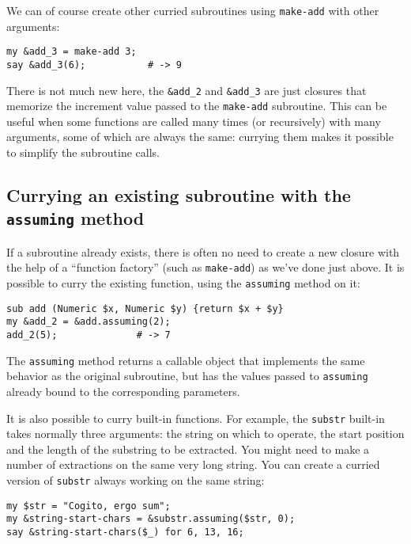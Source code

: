 We can of course create other curried subroutines using 
{\tt make-add} with other arguments:

\begin{verbatim}
my &add_3 = make-add 3;
say &add_3(6);           # -> 9
\end{verbatim}

There is not much new here, the \verb'&add_2' and 
\verb'&add_3' are just closures that memorize the 
increment value passed to the {\tt make-add} 
subroutine. This can be useful when some functions 
are called many times (or recursively) with many  
arguments, some of which are always the same: 
currying them makes it possible to simplify the 
subroutine calls.

\subsection{Currying an existing subroutine with the {\tt assuming} method}

If a subroutine already exists, there is often no need 
to create a new closure with the help of a ``function 
factory'' (such as {\tt make-add}) as we've done just above. 
It is possible to curry the existing function, using 
the {\tt assuming} method on it:

\begin{verbatim}
sub add (Numeric $x, Numeric $y) {return $x + $y}   
my &add_2 = &add.assuming(2);                       
add_2(5);              # -> 7                                     
\end{verbatim}

The {\tt assuming} method returns a callable object 
that implements the same behavior as the original 
subroutine, but has the values passed to {\tt assuming}
already bound to the corresponding parameters.

It is also possible to curry built-in functions. For example, 
the {\tt substr} built-in takes normally three arguments:
the string on which to operate, the start position and the 
length of the substring to be extracted. You might need 
to make a number of extractions on the same very long 
string. You can create a curried version of {\tt substr} 
always working on the same string:

\begin{verbatim}
my $str = "Cogito, ergo sum";                     
my &string-start-chars = &substr.assuming($str, 0);
say &string-start-chars($_) for 6, 13, 16; 
\end{verbatim}

